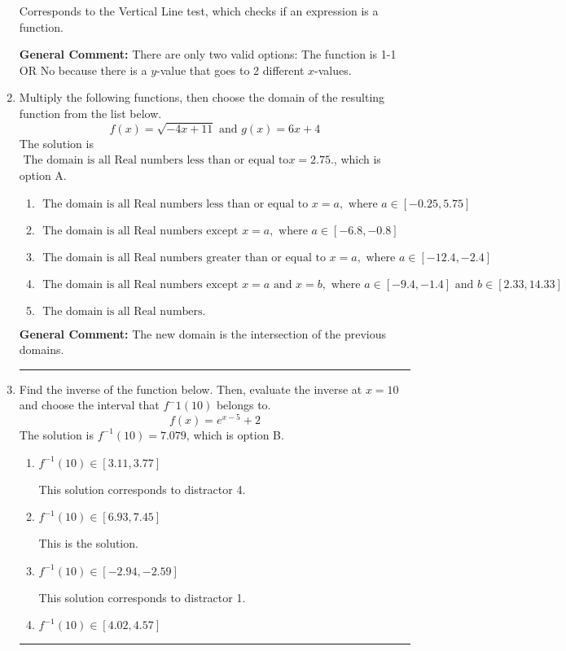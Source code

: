 \documentclass{extbook}[14pt]
\newcommand{\litem}[1]{\item #1

\rule{\textwidth}{0.4pt}}
\begin{document}
\begin{enumerate}
{\begin{enumerate}[label=\Alph*.]
Corresponds to the Vertical Line test, which checks if an expression is a function.
\end{enumerate}

\textbf{General Comment:} There are only two valid options: The function is 1-1 OR No because there is a $y$-value that goes to 2 different $x$-values.
}
\litem{
Multiply the following functions, then choose the domain of the resulting function from the list below.
\[ f(x) = \sqrt{-4x+11}  \text{ and } g(x) = 6x + 4 \]The solution is \( \text{ The domain is all Real numbers less than or equal to} x = 2.75. \), which is option A.\begin{enumerate}[label=\Alph*.]
\item \( \text{ The domain is all Real numbers less than or equal to } x = a, \text{ where } a \in [-0.25, 5.75] \)


\item \( \text{ The domain is all Real numbers except } x = a, \text{ where } a \in [-6.8, -0.8] \)


\item \( \text{ The domain is all Real numbers greater than or equal to } x = a, \text{ where } a \in [-12.4, -2.4] \)


\item \( \text{ The domain is all Real numbers except } x = a \text{ and } x = b, \text{ where } a \in [-9.4, -1.4] \text{ and } b \in [2.33, 14.33] \)


\item \( \text{ The domain is all Real numbers. } \)


\end{enumerate}

\textbf{General Comment:} The new domain is the intersection of the previous domains.
}
\litem{
Find the inverse of the function below. Then, evaluate the inverse at $x = 10$ and choose the interval that $f^-1(10)$ belongs to.
\[ f(x) = e^{x-5}+2 \]The solution is \( f^{-1}(10) = 7.079 \), which is option B.\begin{enumerate}[label=\Alph*.]
\item \( f^{-1}(10) \in [3.11, 3.77] \)

 This solution corresponds to distractor 4.
\item \( f^{-1}(10) \in [6.93, 7.45] \)

 This is the solution.
\item \( f^{-1}(10) \in [-2.94, -2.59] \)

 This solution corresponds to distractor 1.
\item \( f^{-1}(10) \in [4.02, 4.57] \)


\end{enumerate}}
\end{enumerate}
\end{document}
